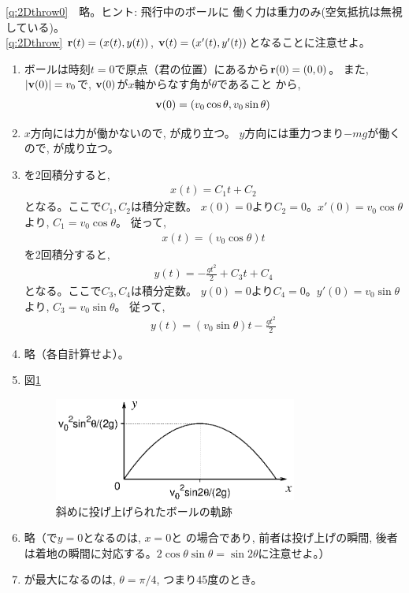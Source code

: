 \ref{q:2Dthrow0}　略。ヒント: 飛行中のボールに
働く力は重力のみ(空気抵抗は無視している)。\\

\ref{q:2Dthrow}
${\bf r}(t)=(x(t), y(t))$, ${\bf v}(t)=(x'(t), y'(t))$となることに注意せよ。
\begin{enumerate}
\item ボールは時刻$t=0$で原点（君の位置）にあるから${\bf r}(0)=(0,0)$。
また, $|{\bf v}(0)|=v_0$で, ${\bf v}(0)$が$x$軸からなす角が$\theta$であること
から, 
\begin{eqnarray}{\bf v}(0)=(v_0\cos\theta, v_0\sin\theta)\end{eqnarray}
\item $x$方向には力が働かないので, が成り立つ。
$y$方向には重力つまり$-mg$が働くので, が成り立つ。
\item {}を2回積分すると, 
\begin{eqnarray}x(t)=C_1t+C_2\end{eqnarray}
となる。ここで$C_1, C_2$は積分定数。
$x(0)=0$より$C_2=0$。$x'(0)=v_0\cos\theta$より, $C_1=v_0\cos\theta$。
従って, 
\begin{eqnarray}x(t)=(v_0\cos\theta)t\end{eqnarray}
を2回積分すると, 
\begin{eqnarray}y(t)=-\frac{gt^2}{2}+C_3t+C_4\end{eqnarray}
となる。ここで$C_3, C_4$は積分定数。
$y(0)=0$より$C_4=0$。$y'(0)=v_0\sin\theta$より, $C_3=v_0\sin\theta$。
従って, 
\begin{eqnarray}y(t)=(v_0\sin\theta)t-\frac{gt^2}{2}\end{eqnarray}
\item 略（各自計算せよ）。
\item 図\ref{fig:throw_ball_slant}
\begin{figure}[h]
    \centering
    \includegraphics[width=8cm]{throw_ball_slant.eps}
    \caption{斜めに投げ上げられたボールの軌跡}\label{fig:throw_ball_slant}
\end{figure}
\item 略（で$y=0$となるのは, $x=0$と
の場合であり, 前者は投げ上げの瞬間, 
後者は着地の瞬間に対応する。$2\cos\theta\sin\theta=\sin2\theta$に注意せよ。）
\item {}が最大になるのは, $\theta=\pi/4$, つまり45度のとき。
\end{enumerate}
\mv

